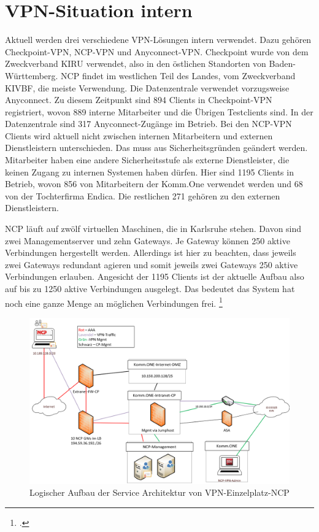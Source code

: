 
\section{VPN-Situation intern} %
\label{sec:VPN-Situation intern}

Aktuell werden drei verschiedene VPN-Lösungen intern verwendet. Dazu gehören Checkpoint-VPN, NCP-VPN und Anyconnect-VPN. Checkpoint wurde von dem Zweckverband KIRU verwendet, also in den östlichen Standorten von Baden-Württemberg. NCP findet im westlichen Teil des Landes, vom Zweckverband KIVBF, die meiste Verwendung. Die Datenzentrale verwendet vorzugsweise Anyconnect. Zu diesem Zeitpunkt sind 894 Clients in Checkpoint-VPN registriert, wovon 889 interne Mitarbeiter und die Übrigen Testclients sind. In der Datenzentrale sind 317 Anyconnect-Zugänge im Betrieb. Bei den NCP-VPN Clients wird aktuell nicht zwischen internen Mitarbeitern und externen Dienstleistern unterschieden. Das muss aus Sicherheitsgründen geändert werden. Mitarbeiter haben eine andere Sicherheitsstufe als externe Dienstleister, die keinen Zugang zu internen Systemen haben dürfen. Hier sind 1195 Clients in Betrieb, wovon 856 von Mitarbeitern der Komm.One verwendet werden und 68 von der Tochterfirma Endica. Die restlichen 271 gehören zu den externen Dienstleistern. 

NCP läuft auf zwölf virtuellen Maschinen, die in Karlsruhe stehen. Davon sind zwei Managementserver und zehn Gateways. Je Gateway können 250 aktive Verbindungen hergestellt werden. Allerdings ist hier zu beachten, dass jeweils zwei Gateways redundant agieren und somit jeweils zwei Gateways 250 aktive Verbindungen erlauben. Angesicht der 1195 Clients ist der aktuelle Aufbau also auf bis zu 1250 aktive Verbindungen ausgelegt. Das bedeutet das System hat noch eine ganze Menge an möglichen Verbindungen frei. \footcite[Vgl.][auch im Folgenden]{Beier.2022a}

\begin{figure}[htb]
  \centering
  \includegraphics[width=14cm]{graphics/NCP.png}
  \caption[Logischer Aufbau der Service Architektur von VPN-Einzelplatz-NCP]{Logischer Aufbau der Service Architektur von VPN-Einzelplatz-NCP \footnotemark}
  \label{abb:NCPAufbau}
\end{figure}

